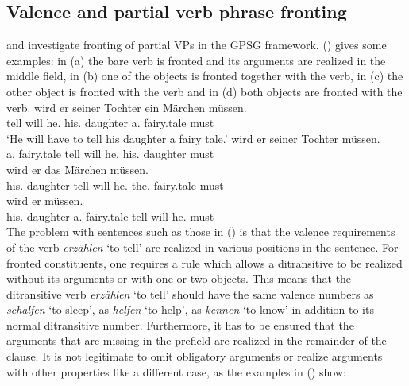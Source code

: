 \subsection{Valence and partial verb phrase fronting}

\citet{Nerbonne86a} and \citet{Johnson86a} investigate fronting of partial VPs in the GPSG
framework.
() gives some examples: in (a) the bare verb is fronted and its arguments are realized
in the middle field, in (b) one of the objects is fronted together with the verb, in
(c) the other object is fronted with the verb and in
(d) both objects are fronted with the verb.
\eal
\ex 
\gll [Erzählen] wird er        seiner     Tochter  ein      Märchen müssen.\\
     \spacebr{}tell     will he.\NOM{} his.\DAT{} daughter a.\ACC{} fairy.tale must\\
\glt `He will have to tell his daughter a fairy tale.'
\ex 
{} wird er seiner Tochter müssen.\\
     \spacebr{}a.\ACC{} fairy.tale tell will he.\NOM{} his.\ACC{} daughter must\\
\ex 
{} wird er das Märchen müssen.\\
     \spacebr{}his.\DAT{} daughter tell will he.\NOM{} the.\ACC{} fairy.tale  must\\
\ex 
{} wird er müssen.\\
     \spacebr{}his.\DAT{} daughter a.\ACC{} fairy.tale tell will he.\NOM{} must\\
\zl
The problem with sentences such as those in () is that the valence requirements of the verb
\emph{erzählen} `to tell' are realized in various positions in the sentence. For fronted
constituents, one requires a rule which allows a ditransitive to be realized without its arguments
or with one or two objects. This means that the ditransitive verb \emph{erzählen} `to tell' should
have the same valence numbers as \emph{schalfen} `to sleep', as \emph{helfen} `to help', as
\emph{kennen} `to know' in addition to its normal ditransitive number. Furthermore, it has to be ensured that the arguments that are
missing in the prefield are realized in the remainder of the clause. It is not legitimate to omit
obligatory arguments or realize arguments with other properties like a different case, as the
examples in () show:
\eal
{}
